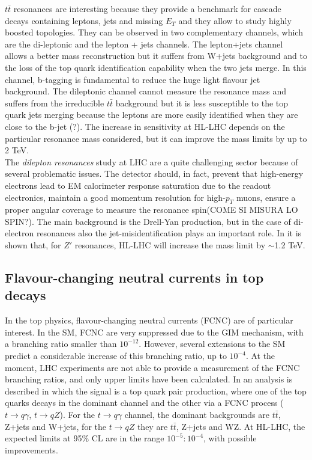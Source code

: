 \documentclass[a4paper,twoside,12pt]{article}
\begin{document}
$t\bar{t}$ resonances are interesting because they provide a benchmark for cascade
decays containing leptons, jets and missing $E_T$ and they allow to study highly boosted
topologies. They can be observed in two complementary channels, which are the di-leptonic and the lepton + jets channels.  The lepton+jets channel allows a better mass reconstruction but it suffers
from W+jets background and to the loss of the top quark identification capability when the two jets merge. In this channel, b-tagging is fundamental to reduce the huge light flavour jet
background. The dileptonic channel cannot measure the resonance mass and suffers from the irreducible $t\bar{t}$ background but
it is less susceptible to the top quark jets merging because the leptons are more easily 
identified when they are close to the b-jet (?).  The increase in sensitivity at HL-LHC depends
on the particular resonance mass considered, but it can improve the mass limits by up to
2 TeV.\\

The \textit{dilepton resonances} study at LHC are a quite challenging sector because of
several problematic issues. The detector should, in fact, prevent that high-energy electrons lead to EM calorimeter
response saturation due to the readout electronics, maintain a good momentum resolution for high-$p_T$ muons, ensure a proper angular coverage to measure the resonance spin(COME SI MISURA LO SPIN?). The main background is the Drell-Yan production, but in the 
case of di-electron resonances also the jet-misidentification plays an important role. In \cite{loi}
it is shown that, for $Z'$ resonances, HL-LHC will increase the mass limit by $\sim$1.2 TeV.

\subsection{Flavour-changing neutral currents in top decays}
In the top physics, flavour-changing neutral currents (FCNC) are of particular interest.
In the SM, FCNC are very suppressed due to the GIM mechanism, with a branching ratio smaller
than $10^{-12}$. However, several extensions to the SM predict a considerable increase of this branching ratio, up to $10^{-4}$. At the moment, LHC experiments are not able to provide a measurement of the FCNC branching ratios, and only upper limits have been calculated. 
In \cite{loi} an analysis is described in which the signal is a top quark pair production, where
one of the top quarks decays in the dominant channel and the other via a FCNC process 
($t \rightarrow q\gamma$, $t \rightarrow qZ$). For the $t \rightarrow q\gamma$ channel, 
the dominant backgrounds are $t\bar{t}$, Z+jets and W+jets, for the $t \rightarrow qZ$ they are $t\bar{t}$, Z+jets and WZ. At HL-LHC, the expected limits at 95\% CL are in the range
$10^{-5} : 10^{-4}$, with possible improvements. 
\end{document}

